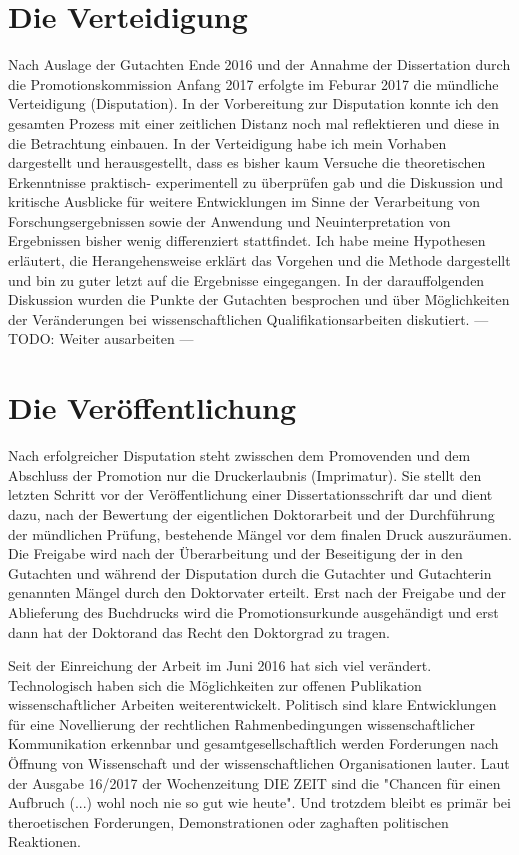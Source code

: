 \begin{vorspann}
\section{Die Verteidigung}

Nach Auslage der Gutachten Ende 2016 und der Annahme der Dissertation durch die Promotionskommission Anfang 2017 erfolgte im Feburar 2017 die mündliche Verteidigung (Disputation). In der Vorbereitung zur Disputation konnte ich den gesamten Prozess mit einer zeitlichen Distanz noch mal reflektieren und diese in die Betrachtung einbauen. In der Verteidigung habe ich mein Vorhaben dargestellt und herausgestellt, dass es bisher kaum Versuche die theoretischen Erkenntnisse praktisch- experimentell zu überprüfen gab und die Diskussion und kritische Ausblicke für weitere Entwicklungen im Sinne der Verarbeitung von Forschungsergebnissen sowie der Anwendung und Neuinterpretation von Ergebnissen bisher wenig differenziert stattfindet. Ich habe meine Hypothesen erläutert, die Herangehensweise erklärt das Vorgehen und die Methode dargestellt und bin zu guter letzt auf die Ergebnisse eingegangen. In der darauffolgenden Diskussion wurden die Punkte der Gutachten besprochen und über Möglichkeiten der Veränderungen bei wissenschaftlichen Qualifikationsarbeiten diskutiert. --- TODO: Weiter ausarbeiten ---

\section{Die Veröffentlichung}

Nach erfolgreicher Disputation steht zwisschen dem Promovenden und dem Abschluss der Promotion nur die Druckerlaubnis (Imprimatur). Sie stellt den letzten Schritt vor der Veröffentlichung einer Dissertationsschrift dar und dient dazu, nach der Bewertung der eigentlichen Doktorarbeit und der Durchführung der mündlichen Prüfung, bestehende Mängel vor dem finalen Druck auszuräumen. Die Freigabe wird nach der Überarbeitung und der Beseitigung der in den Gutachten und während der Disputation durch die Gutachter und Gutachterin genannten Mängel durch den Doktorvater erteilt. Erst nach der Freigabe und der Ablieferung des Buchdrucks wird die Promotionsurkunde ausgehändigt und erst dann hat der Doktorand das Recht den Doktorgrad zu tragen.

Seit der Einreichung der Arbeit im Juni 2016 hat sich viel verändert. Technologisch haben sich die Möglichkeiten zur offenen Publikation wissenschaftlicher Arbeiten weiterentwickelt. Politisch sind klare Entwicklungen für eine Novellierung der rechtlichen Rahmenbedingungen wissenschaftlicher Kommunikation erkennbar und gesamtgesellschaftlich werden Forderungen nach Öffnung von Wissenschaft und der wissenschaftlichen Organisationen lauter. Laut der Ausgabe 16/2017 der Wochenzeitung DIE ZEIT sind die "Chancen für einen Aufbruch (...) wohl noch nie so gut wie heute". Und trotzdem bleibt es primär bei theroetischen Forderungen, Demonstrationen oder zaghaften politischen Reaktionen.


\end{vorspann}
